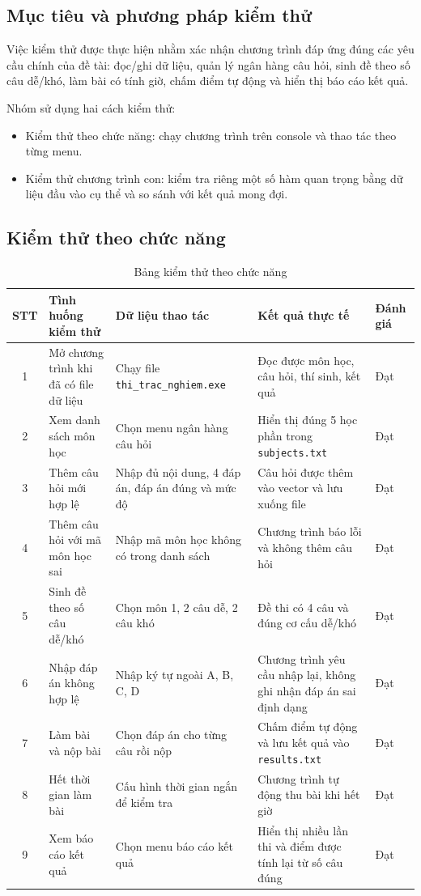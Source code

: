 \documentclass[12pt,a4paper]{article}
\begin{document}
\subsection{Mục tiêu và phương pháp kiểm thử}

Việc kiểm thử được thực hiện nhằm xác nhận chương trình đáp ứng đúng các yêu cầu chính của đề tài: đọc/ghi dữ liệu, quản lý ngân hàng câu hỏi, sinh đề theo số câu dễ/khó, làm bài có tính giờ, chấm điểm tự động và hiển thị báo cáo kết quả.

Nhóm sử dụng hai cách kiểm thử:

\begin{itemize}
    \item Kiểm thử theo chức năng: chạy chương trình trên console và thao tác theo từng menu.
    \item Kiểm thử chương trình con: kiểm tra riêng một số hàm quan trọng bằng dữ liệu đầu vào cụ thể và so sánh với kết quả mong đợi.
\end{itemize}

\subsection{Kiểm thử theo chức năng}

\begin{table}[H]
\centering
\begin{tabular}{|c|p{4.4cm}|p{4.4cm}|p{3.2cm}|p{1.4cm}|}
\hline
\textbf{STT} & \textbf{Tình huống kiểm thử} & \textbf{Dữ liệu thao tác} & \textbf{Kết quả thực tế} & \textbf{Đánh giá} \\
\hline
1 & Mở chương trình khi đã có file dữ liệu & Chạy file \texttt{thi\_trac\_nghiem.exe} & Đọc được môn học, câu hỏi, thí sinh, kết quả & Đạt \\
\hline
2 & Xem danh sách môn học & Chọn menu ngân hàng câu hỏi & Hiển thị đúng 5 học phần trong \texttt{subjects.txt} & Đạt \\
\hline
3 & Thêm câu hỏi mới hợp lệ & Nhập đủ nội dung, 4 đáp án, đáp án đúng và mức độ & Câu hỏi được thêm vào vector và lưu xuống file & Đạt \\
\hline
4 & Thêm câu hỏi với mã môn học sai & Nhập mã môn học không có trong danh sách & Chương trình báo lỗi và không thêm câu hỏi & Đạt \\
\hline
5 & Sinh đề theo số câu dễ/khó & Chọn môn 1, 2 câu dễ, 2 câu khó & Đề thi có 4 câu và đúng cơ cấu dễ/khó & Đạt \\
\hline
6 & Nhập đáp án không hợp lệ & Nhập ký tự ngoài A, B, C, D & Chương trình yêu cầu nhập lại, không ghi nhận đáp án sai định dạng & Đạt \\
\hline
7 & Làm bài và nộp bài & Chọn đáp án cho từng câu rồi nộp & Chấm điểm tự động và lưu kết quả vào \texttt{results.txt} & Đạt \\
\hline
8 & Hết thời gian làm bài & Cấu hình thời gian ngắn để kiểm tra & Chương trình tự động thu bài khi hết giờ & Đạt \\
\hline
9 & Xem báo cáo kết quả & Chọn menu báo cáo kết quả & Hiển thị nhiều lần thi và điểm được tính lại từ số câu đúng & Đạt \\
\hline
\end{tabular}
\caption{Bảng kiểm thử theo chức năng}
\end{table}
\end{document}
